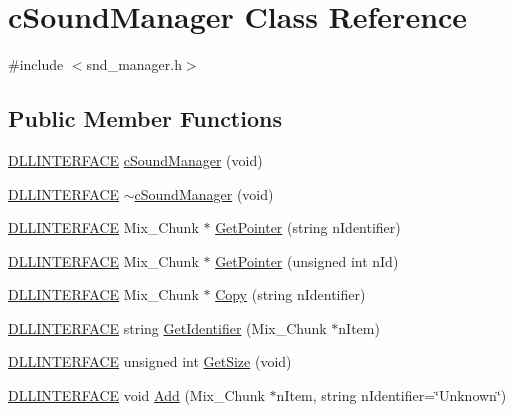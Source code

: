 \hypertarget{classc_sound_manager}{\section{c\-Sound\-Manager Class Reference}
\label{classc_sound_manager}
}


{\ttfamily \#include $<$snd\-\_\-manager.\-h$>$}

\subsection*{Public Member Functions}
\begin{DoxyCompactItemize}
\item 
\hyperlink{_s_d_l__ep_8h_a38dd54df4631b4daf553096353d7b20b}{D\-L\-L\-I\-N\-T\-E\-R\-F\-A\-C\-E} \hyperlink{classc_sound_manager_a829692a8c5af7a5c7ab3c9c1a6a74dcc}{c\-Sound\-Manager} (void)
\item 
\hyperlink{_s_d_l__ep_8h_a38dd54df4631b4daf553096353d7b20b}{D\-L\-L\-I\-N\-T\-E\-R\-F\-A\-C\-E} \hyperlink{classc_sound_manager_a36a32f8276a939765d3b734aa15b77e7}{$\sim$c\-Sound\-Manager} (void)
\item 
\hyperlink{_s_d_l__ep_8h_a38dd54df4631b4daf553096353d7b20b}{D\-L\-L\-I\-N\-T\-E\-R\-F\-A\-C\-E} Mix\-\_\-\-Chunk $\ast$ \hyperlink{classc_sound_manager_ab8a71785acc0c5609998c09cc0d76f05}{Get\-Pointer} (string n\-Identifier)
\item 
\hyperlink{_s_d_l__ep_8h_a38dd54df4631b4daf553096353d7b20b}{D\-L\-L\-I\-N\-T\-E\-R\-F\-A\-C\-E} Mix\-\_\-\-Chunk $\ast$ \hyperlink{classc_sound_manager_a9574da9473fb749856b3c5da87029e87}{Get\-Pointer} (unsigned int n\-Id)
\item 
\hyperlink{_s_d_l__ep_8h_a38dd54df4631b4daf553096353d7b20b}{D\-L\-L\-I\-N\-T\-E\-R\-F\-A\-C\-E} Mix\-\_\-\-Chunk $\ast$ \hyperlink{classc_sound_manager_a8dc217b89464b7ffae44b70e6710cb27}{Copy} (string n\-Identifier)
\item 
\hyperlink{_s_d_l__ep_8h_a38dd54df4631b4daf553096353d7b20b}{D\-L\-L\-I\-N\-T\-E\-R\-F\-A\-C\-E} string \hyperlink{classc_sound_manager_aa2e3abf7cd4fd474b908ef32eb0df81f}{Get\-Identifier} (Mix\-\_\-\-Chunk $\ast$n\-Item)
\item 
\hyperlink{_s_d_l__ep_8h_a38dd54df4631b4daf553096353d7b20b}{D\-L\-L\-I\-N\-T\-E\-R\-F\-A\-C\-E} unsigned int \hyperlink{classc_sound_manager_a52e2a9e80ef3bd54387af7715c94c1be}{Get\-Size} (void)
\item 
\hyperlink{_s_d_l__ep_8h_a38dd54df4631b4daf553096353d7b20b}{D\-L\-L\-I\-N\-T\-E\-R\-F\-A\-C\-E} void \hyperlink{classc_sound_manager_a0b9ebf21daec6630aeab06be3f87f701}{Add} (Mix\-\_\-\-Chunk $\ast$n\-Item, string n\-Identifier=\char`\"{}Unknown\char`\"{})

\end{DoxyCompactItemize}
